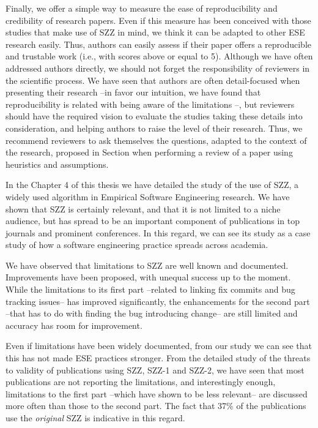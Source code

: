 \documentclass[a4paper, 12pt]{book}
\begin{document}
Finally, we offer a simple way to measure the ease of reproducibility and credibility of research papers. Even if this measure has been conceived with those studies that make use of SZZ in mind, we think it can be adapted to other ESE research easily. Thus, authors can easily assess if their paper offers a reproducible and trustable work (i.e., with scores above or equal to 5). Although we have often addressed authors directly, we should not forget the responsibility of reviewers in the scientific process. We have seen that authors are often detail-focused when presenting their research --in favor our intuition, we have found that reproducibility is related with being aware of the limitations --, but reviewers should have the required vision to evaluate the studies taking these details into consideration, and helping authors to raise the level of their research. Thus, we recommend reviewers to ask themselves the questions, adapted to the context of the research, proposed in Section when performing a review of a paper using heuristics and assumptions.

In the Chapter 4 of this thesis we have detailed the study of the use of SZZ, a widely used algorithm in Empirical Software Engineering research. We have shown that SZZ is certainly relevant, and that it is not limited to a niche audience, but has spread to be an important component of publications in top journals and prominent conferences. In this regard, we can see its study as a case study of how a software engineering practice spreads across academia.

We have observed that limitations to SZZ are well known and documented. Improvements have been proposed, with unequal success up to the moment. While the limitations to its first part --related to linking fix commits and bug tracking issues-- has improved significantly, the enhancements for the second part --that has to do with finding the bug introducing change-- are still limited and accuracy has room for improvement.

Even if limitations have been widely documented, from our study we can see that this has not made ESE practices stronger. From the detailed study of the threats to validity of publications using SZZ, SZZ-1 and SZZ-2, we have seen that most publications are not reporting the limitations, and interestingly enough, limitations to the first part --which have shown to be less relevant-- are discussed more often than those to the second part. The fact that 37\% of the publications use the \emph{original} SZZ is indicative in this regard.
\end{document}
